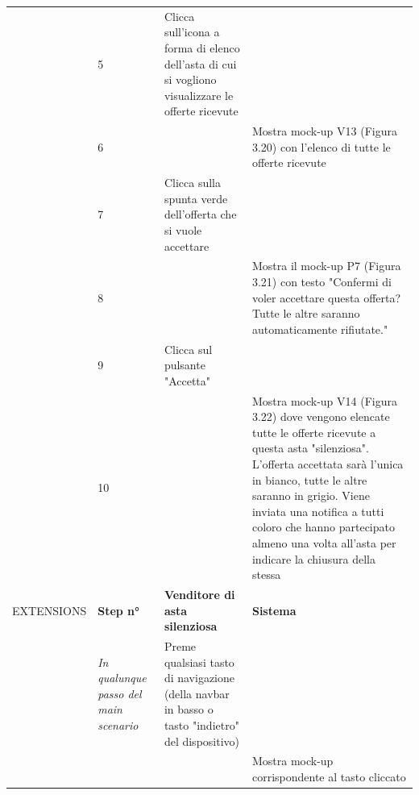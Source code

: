 \begin{longtable}{|C{3.0cm}|C{1.3cm}|L{5.2cm}|L{5.2cm}|}
                        & 5
                        & Clicca sull'icona a forma di elenco dell'asta di cui si vogliono visualizzare le offerte ricevute
                        & \\
                        & 6
                        & 
                        & Mostra mock-up V13 (Figura 3.20) con l'elenco di tutte le offerte ricevute\\
                        & 7
                        & Clicca sulla spunta verde dell'offerta che si vuole accettare
                        & \\
                        & 8
                        & 
                        & Mostra il mock-up P7 (Figura 3.21) con testo "Confermi di voler accettare questa offerta? Tutte le altre saranno automaticamente rifiutate."\\
                        & 9
                        & Clicca sul pulsante "Accetta"
                        & \\
                        & 10
                        & 
                        & Mostra mock-up V14 (Figura 3.22) dove vengono elencate tutte le offerte ricevute a questa asta "silenziosa". L'offerta accettata sarà l'unica in bianco, tutte le altre saranno in grigio. Viene inviata una notifica a tutti coloro che hanno partecipato almeno una volta all'asta per indicare la chiusura della stessa\\
                \hline
                    EXTENSIONS
                    & \textbf{Step n°} 
                    & \textbf{Venditore di asta silenziosa} 
                    & \textbf{Sistema}\\
                \hline
                        & \textit{In qualunque passo del main scenario}
                        & Preme qualsiasi tasto di navigazione (della navbar in basso o tasto "indietro" del dispositivo)
                        & \\
                        & 
                        & 
                        & Mostra mock-up corrispondente al tasto cliccato\\

\end{longtable}
